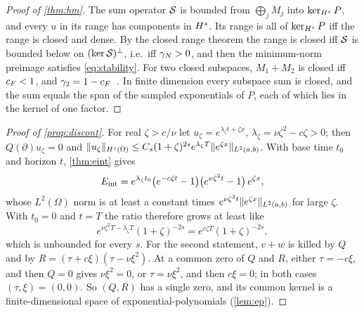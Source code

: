 \begin{proof}[Proof of \cref{thm:hm}]
The sum operator $\mathcal{S}$ is bounded from $\bigoplus_jM_j$ into $\ker_{H^{s}}P$, and every $u$ in its range has
components in $H^{s}$. Its range is all of $\ker_{H^{s}}P$ iff the range is closed and dense. By the closed range theorem the
range is closed iff $\mathcal{S}$ is bounded below on $(\ker\mathcal{S})^\perp$, i.e.\ iff $\gamma_{N}>0$, and then the minimum-norm
preimage satisfies \eqref{eq:stability}. For two closed subspaces, $M_1+M_2$ is closed iff $c_{F}<1$, and
$\gamma_2=1-c_{F}$~\cite{Deu01}. In finite dimension every subspace sum is closed, and the sum equals the span of
the sampled exponentials of $P$, each of which lies in the kernel of one factor.
\end{proof}

\begin{proof}[Proof of \cref{prop:discont}]
For real $\zeta>c/\nu$ let $u_\zeta=e^{\lambda_\zeta t+\zeta x}$, $\lambda_\zeta=\nu\zeta^2-c\zeta>0$; then $Q(\partial)u_\zeta=0$ and
$\lVert u_\zeta\rVert_{H^{s}(\Omega)}\le C_s(1+\zeta)^{2s}e^{\lambda_\zeta T}\lVert e^{\zeta x}\rVert_{L^2(a,b)}$. With base time $t_0$ and horizon
$t$, \cref{thm:eint} gives
\[
  E_{\mathrm{int}}=e^{\lambda_\zeta t_0}\big(e^{-c\zeta t}-1\big)\big(e^{\nu\zeta^2t}-1\big)\,e^{\zeta x},
\]
whose $L^2(\Omega)$ norm is at least a constant times $e^{\nu\zeta^2t}\lVert e^{\zeta x}\rVert_{L^2(a,b)}$ for large $\zeta$. With
$t_0=0$ and $t=T$ the ratio therefore grows at least like
\[
  e^{\nu\zeta^2T-\lambda_\zeta T}(1+\zeta)^{-2s}=e^{c\zeta T}(1+\zeta)^{-2s},
\]
which is unbounded for every $s$. For the second statement, $v+w$ is killed by $Q$ and by
$R=(\tau+c\xi)(\tau-\nu\xi^2)$. At a common zero of $Q$ and $R$, either $\tau=-c\xi$, and then $Q=0$ gives
$\nu\xi^2=0$, or $\tau=\nu\xi^2$, and then $c\xi=0$; in both cases $(\tau,\xi)=(0,0)$. So $(Q,R)$ has a single zero, and
its common kernel is a finite-dimensional space of exponential-polynomials (\cref{lem:ep}).
\end{proof}
